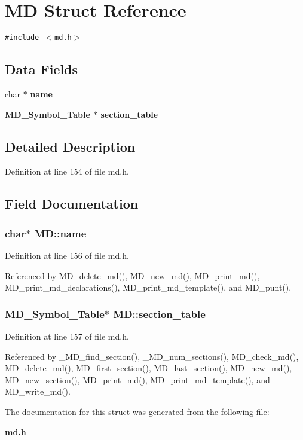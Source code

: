 \section{MD Struct Reference}
\label{structMD}
{\tt \#include $<$md.h$>$}

\subsection*{Data Fields}
\begin{CompactItemize}
\item 
char $\ast$ \bf{name}
\item 
\bf{MD\_\-Symbol\_\-Table} $\ast$ \bf{section\_\-table}
\end{CompactItemize}


\subsection{Detailed Description}




Definition at line 154 of file md.h.

\subsection{Field Documentation}
\subsubsection{\setlength{\rightskip}{0pt plus 5cm}char$\ast$ \bf{MD::name}}\label{structMD_3897d56c1462bdc067453fe3a7d61131}




Definition at line 156 of file md.h.

Referenced by MD\_\-delete\_\-md(), MD\_\-new\_\-md(), MD\_\-print\_\-md(), MD\_\-print\_\-md\_\-declarations(), MD\_\-print\_\-md\_\-template(), and MD\_\-punt().
\subsubsection{\setlength{\rightskip}{0pt plus 5cm}\bf{MD\_\-Symbol\_\-Table}$\ast$ \bf{MD::section\_\-table}}\label{structMD_4315b67d68c89d5d7b88c9102069aad7}




Definition at line 157 of file md.h.

Referenced by \_\-MD\_\-find\_\-section(), \_\-MD\_\-num\_\-sections(), MD\_\-check\_\-md(), MD\_\-delete\_\-md(), MD\_\-first\_\-section(), MD\_\-last\_\-section(), MD\_\-new\_\-md(), MD\_\-new\_\-section(), MD\_\-print\_\-md(), MD\_\-print\_\-md\_\-template(), and MD\_\-write\_\-md().

The documentation for this struct was generated from the following file:\begin{CompactItemize}
\item 
\bf{md.h}\end{CompactItemize}
